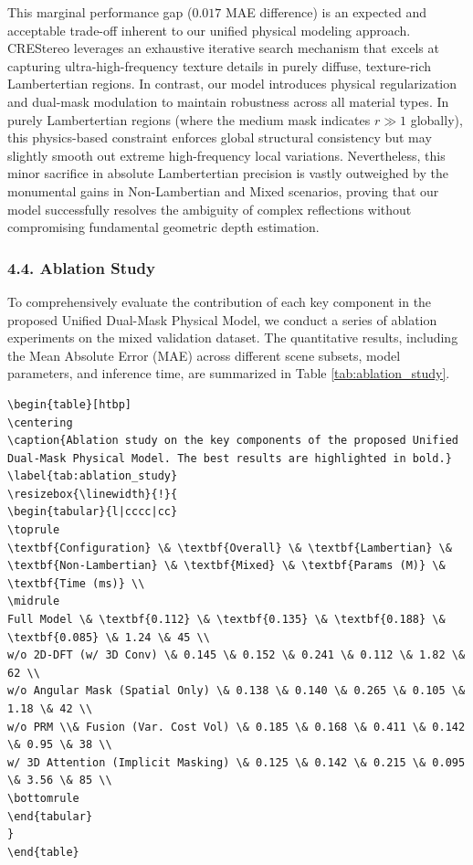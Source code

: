 \documentclass[lettersize,journal]{IEEEtran}
\begin{document}
This marginal performance gap ($0.017$ MAE difference) is an expected and acceptable trade-off inherent to our unified physical modeling approach. CREStereo leverages an exhaustive iterative search mechanism that excels at capturing ultra-high-frequency texture details in purely diffuse, texture-rich Lambertertian regions. In contrast, our model introduces physical regularization and dual-mask modulation to maintain robustness across all material types. In purely Lambertertian regions (where the medium mask indicates $r \gg 1$ globally), this physics-based constraint enforces global structural consistency but may slightly smooth out extreme high-frequency local variations. Nevertheless, this minor sacrifice in absolute Lambertertian precision is vastly outweighed by the monumental gains in Non-Lambertian and Mixed scenarios, proving that our model successfully resolves the ambiguity of complex reflections without compromising fundamental geometric depth estimation.

\subsubsection{4.4. Ablation Study}

To comprehensively evaluate the contribution of each key component in the proposed Unified Dual-Mask Physical Model, we conduct a series of ablation experiments on the mixed validation dataset. The quantitative results, including the Mean Absolute Error (MAE) across different scene subsets, model parameters, and inference time, are summarized in Table \ref{tab:ablation_study}.

\begin{verbatim}
\begin{table}[htbp]
\centering
\caption{Ablation study on the key components of the proposed Unified Dual-Mask Physical Model. The best results are highlighted in bold.}
\label{tab:ablation_study}
\resizebox{\linewidth}{!}{
\begin{tabular}{l|cccc|cc}
\toprule
\textbf{Configuration} \& \textbf{Overall} \& \textbf{Lambertian} \& \textbf{Non-Lambertian} \& \textbf{Mixed} \& \textbf{Params (M)} \& \textbf{Time (ms)} \\
\midrule
Full Model \& \textbf{0.112} \& \textbf{0.135} \& \textbf{0.188} \& \textbf{0.085} \& 1.24 \& 45 \\
w/o 2D-DFT (w/ 3D Conv) \& 0.145 \& 0.152 \& 0.241 \& 0.112 \& 1.82 \& 62 \\
w/o Angular Mask (Spatial Only) \& 0.138 \& 0.140 \& 0.265 \& 0.105 \& 1.18 \& 42 \\
w/o PRM \\& Fusion (Var. Cost Vol) \& 0.185 \& 0.168 \& 0.411 \& 0.142 \& 0.95 \& 38 \\
w/ 3D Attention (Implicit Masking) \& 0.125 \& 0.142 \& 0.215 \& 0.095 \& 3.56 \& 85 \\
\bottomrule
\end{tabular}
}
\end{table}

\end{verbatim}
\end{document}
